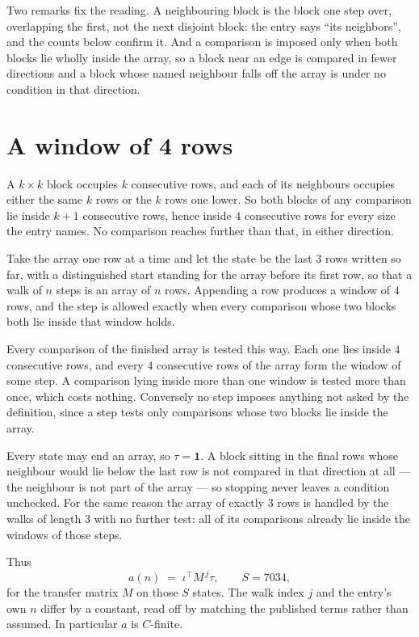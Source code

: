 \documentclass[11pt,a4paper]{article}
\theoremstyle{plain}
\theoremstyle{definition}
\begin{document}
Two remarks fix the reading. A neighbouring block is the block one step over, overlapping the
first, not the next disjoint block: the entry says ``its neighbors'', and the counts below
confirm it. And a comparison is imposed only when both blocks lie wholly inside the array, so a
block near an edge is compared in fewer directions and a block whose named neighbour falls off
the array is under no condition in that direction.

\section{A window of 4 rows}

A $k\times k$ block occupies $k$ consecutive rows, and each of its neighbours occupies either
the same $k$ rows or the $k$ rows one lower. So both blocks of any comparison lie inside $k+1$
consecutive rows, hence inside $4$ consecutive rows for every size the entry names. No
comparison reaches further than that, in either direction.

Take the array one row at a time and let the state be the last 3 rows written so far, with a
distinguished start standing for the array before its first row, so that a walk of $n$ steps is
an array of $n$ rows. Appending a row produces a window of $4$ rows, and the step is
allowed exactly when every comparison whose two blocks both lie inside that window holds.

Every comparison of the finished array is tested this way. Each one lies inside $4$
consecutive rows, and every $4$ consecutive rows of the array form the window of some
step. A comparison lying inside more than one window is tested more than once, which costs
nothing. Conversely no step imposes anything not asked by the definition, since a step tests
only comparisons whose two blocks lie inside the array.

Every state may end an array, so $\tau=\mathbf{1}$. A block sitting in the final rows whose
neighbour would lie below the last row is not compared in that direction at all --- the
neighbour is not part of the array --- so stopping never leaves a condition unchecked. For the
same reason the array of exactly $3$ rows is handled by the walks of length $3$ with no
further test: all of its comparisons already lie inside the windows of those steps.

Thus
\[
a(n)\;=\;\iota^{\!\top}M^{\,j}\tau ,\qquad S=7034,
\]
for the transfer matrix $M$ on those $S$ states. The walk index $j$ and the entry's own $n$
differ by a constant, read off by matching the published terms rather than assumed. In
particular $a$ is $C$-finite.
\end{document}

